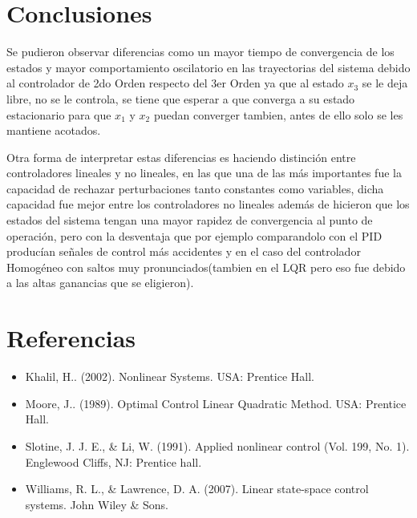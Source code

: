 \documentclass[onecolumn,10pt]{article}
\begin{document}
\section{Conclusiones}
Se pudieron observar diferencias como un mayor tiempo de convergencia de los estados y mayor comportamiento oscilatorio en las trayectorias del sistema debido al controlador de 2do Orden respecto del 3er Orden ya que al estado $x_3$ se le deja libre, no se le controla, se tiene que esperar a que converga a su estado estacionario para que $x_1$ y $x_2$ puedan converger tambien, antes de ello solo se les mantiene acotados.

Otra forma de interpretar estas diferencias es haciendo distinci\'on entre controladores lineales y no lineales, en las que una de las m\'as importantes fue la capacidad de rechazar perturbaciones tanto constantes como variables, dicha capacidad fue mejor entre los controladores no lineales  adem\'as de hicieron que los estados del sistema tengan una mayor rapidez de convergencia al punto de operaci\'on, pero con la desventaja que por ejemplo comparandolo con el PID produc\'ian se\~nales de control m\'as accidentes y en el caso del controlador Homog\'eneo con saltos muy pronunciados(tambien en el LQR pero eso fue debido a las altas ganancias que se eligieron).




\section{Referencias}
\begin{itemize}
\item Khalil, H.. (2002). Nonlinear Systems. USA: Prentice Hall.
\item Moore, J.. (1989). Optimal Control Linear Quadratic Method. USA: Prentice Hall. 
\item Slotine, J. J. E., \& Li, W. (1991). Applied nonlinear control (Vol. 199, No. 1). Englewood Cliffs, NJ: Prentice hall.
\item Williams, R. L., \& Lawrence, D. A. (2007). Linear state-space control systems. John Wiley \& Sons.
\end{itemize}

 
 
\end{document}
